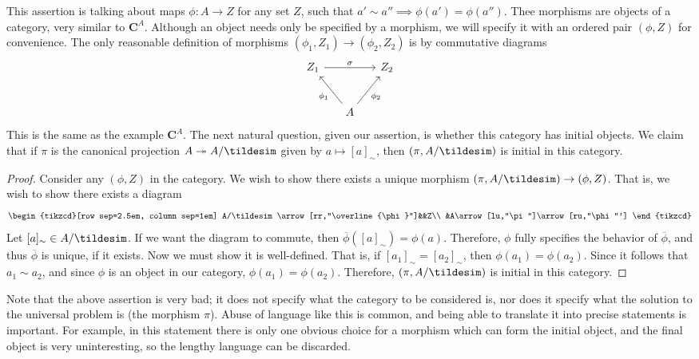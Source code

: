 This assertion is talking about maps $\phi : A \to Z$ for any set $Z$, such that $a'\sim a''\implies \phi (a')=\phi (a'')$. Thee morphisms are objects of a category, very similar to $\mathbf{C}^{A}$. Although an object needs only be specified by a morphism, we will specify it with an ordered pair $(\phi ,Z)$ for convenience. The only reasonable definition of morphisms $(\phi_1,Z_1)\to (\phi_2,Z_2)$ is by commutative diagrams
\[\begin{tikzcd}[row sep=2.5em, column sep=1.5em]
	Z_1\arrow[rr,"\sigma "]&&Z_2\\
			       &A\arrow[lu,"\phi_1"]\arrow[ru,"\phi_2"']
\end{tikzcd}\]
This is the same as the example $\mathbf{C}^{A}$. The next natural question, given our assertion, is whether this category has initial objects. We claim that if $\pi $ is the canonical projection $A \twoheadrightarrow A/\tildesim  $ given by $a\mapsto [a]_\sim $, then $(\pi ,A/\tildesim  )$ is initial in this category.
\begin{proof}
	Consider any $(\phi ,Z)$ in the category. We wish to show there exists a unique morphism $(\pi ,A /\tildesim  )\to (\phi  ,Z)$. That is, we wish to show there exists a diagram
\[\begin{tikzcd}[row sep=2.5em, column sep=1em]
	A/\tildesim \arrow[rr,"\overline{\phi }"]&&Z\\
					   &A\arrow[lu,"\pi "]\arrow[ru,"\phi "']
\end{tikzcd}\]
Let $[a]_\sim \in A /\tildesim  $. If we want the diagram to commute, then $\overline{\phi } ([a]_\sim )=\phi (a)$. Therefore, $\phi $ fully specifies the behavior of $\overline{\phi } $, and thus $\overline{\phi } $ is unique, if it exists. Now we must show it is well-defined. That is, if $[a_1]_\sim =[a_2]_\sim $, then $\phi (a_1)=\phi (a_2)$. Since it follows that $a_1\sim a_2$, and since $\phi $ is an object in our category, $\phi (a_1)=\phi (a_2)$. Therefore, $(\pi ,A/\tildesim )$ is initial in this category.
\end{proof}
Note that the above assertion is very bad; it does not specify what the category to be considered is, nor does it specify what the solution to the universal problem is (the morphism $\pi $). Abuse of language like this is common, and being able to translate it into precise statements is important. For example, in this statement there is only one obvious choice for a morphism which can form the initial object, and the final object is very uninteresting, so the lengthy language can be discarded.


